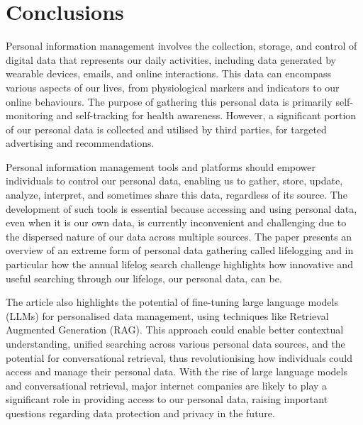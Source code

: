 \documentclass[11pt]{article}
\begin{document}
\section{Conclusions}

Personal information management involves the collection, storage, and control of digital data that represents our daily activities, including data generated by wearable devices, emails, and online interactions. This data can encompass various aspects of our lives, from physiological markers and indicators to our online behaviours. The purpose of gathering this personal data is primarily self-monitoring and self-tracking for health awareness. However, a significant portion of our personal data is collected and utilised by third parties, for targeted advertising and recommendations.

Personal information management tools and platforms should empower individuals to control our personal data, enabling us to gather, store, update, analyze, interpret, and sometimes share this data, regardless of its source. The development of such tools is essential because accessing and using personal data, even when it is our own data, is currently inconvenient and challenging due to the dispersed nature of our data across multiple sources. The paper presents an overview of an extreme form of personal data gathering called lifelogging and in particular how the annual lifelog search challenge highlights how innovative and useful searching through our lifelogs, our personal data, can be.

The article also highlights the potential of fine-tuning large language models (LLMs) for personalised data management, using techniques like Retrieval Augmented Generation (RAG). This approach could enable better contextual understanding, unified searching across various personal data sources, and the potential for conversational retrieval, thus revolutionising how individuals could access and manage their personal data.  With the rise of large language models and conversational retrieval, major internet companies are likely to play a significant role in providing access to our personal data, raising important questions regarding data protection and privacy in the future.




\end{document}
